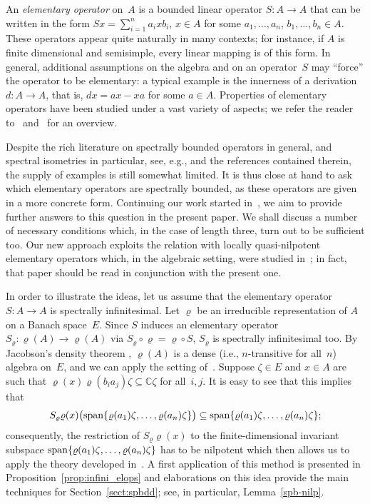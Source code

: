 \documentclass[a4paper,12pt,reqno]{amsart}
\numberwithin{equation}{section}
\theoremstyle{definition}
\begin{document}
An \textit{elementary operator\/} on~$A$ is a bounded linear operator $S\colon A\to A$ that can be written in the form
$Sx=\sum_{i=1}^n a_ixb_i$, $x\in A$ for some $a_1,\ldots,a_n$,  $b_1,\ldots,b_n\in A$.
These operators appear quite naturally in many contexts; for instance, if $A$ is finite dimensional and semisimple, every linear mapping
is of this form. In general, additional assumptions on the algebra and on an operator~$S$ may ``force'' the operator to be elementary:
a typical example is the innerness of a derivation $d\colon A\to A$, that is, $dx=ax-xa$ for some $a\in A$.
Properties of elementary operators have been studied under a vast variety of aspects; we refer the reader to~\cite{Ma92}
and~\cite{CuMa2} for an overview.

Despite the rich literature on spectrally bounded operators in general, and spectral isometries in particular, see, e.g.,
\cite{BrSe2, Co09, CoRe, Mat2, MaSo2, Sem} and the references contained therein, the supply of examples is still somewhat limited.
It is thus close at hand to ask which elementary operators are spectrally bounded, as these operators are given in a more concrete form.
Continuing our work started in~\cite{NaMa11}, we aim to provide further answers to this question in the present paper.
We shall discuss a number of necessary conditions which, in the case of length three, turn out to be sufficient too.
Our new approach exploits the relation with locally quasi-nilpotent elementary operators which, in the algebraic setting,
were studied in~\cite{NaMa13}; in fact, that paper should be read in conjunction with the present one.

In order to illustrate the ideas, let us assume  that the elementary operator $S\colon A\to A$ is spectrally infinitesimal.
Let $\varrho$ be an irreducible representation of $A$ on a Banach space~$E$. Since $S$ induces an elementary operator
$S_\varrho\colon\varrho(A)\to\varrho(A)$ via $S_\varrho\circ\varrho=\varrho\circ S$, $S_\varrho$ is spectrally infinitesimal too.
By Jacobson's density theorem \cite[Theorem~4.2.5]{Aup}, $\varrho(A)$ is a dense (i.e., $n$-transitive for all~$n$) algebra on~$E$,
and we can apply the setting of~\cite{NaMa13}. Suppose $\zeta\in E$ and $x\in A$ are such that
$\varrho(x)\varrho(b_ia_j)\zeta\subseteq{\mathbb{C}}\zeta$ for all~$i,j$. It is easy to see that this implies that
\[
S_\varrho\varrho(x)\bigl({{\rm span}}\{\varrho(a_1)\zeta,\ldots,\varrho(a_n)\zeta\}\bigr)\subseteq{{\rm span}}\{\varrho(a_1)\zeta,\ldots,\varrho(a_n)\zeta\};
\]
consequently, the restriction of
$S_\varrho\varrho(x)$ to the finite-dimensional invariant subspace ${{\rm span}}\{\varrho(a_1)\zeta,\ldots,\varrho(a_n)\zeta\}$ has to be nilpotent
which then allows us to apply the theory developed in~\cite{NaMa13}. A first application of this method is presented in
Proposition~\ref{prop:infini_elops} and elaborations on this idea provide the main techniques for Section~\ref{sect:spbdd};
see, in particular, Lemma~\ref{spb-nilp}.
\end{document}
